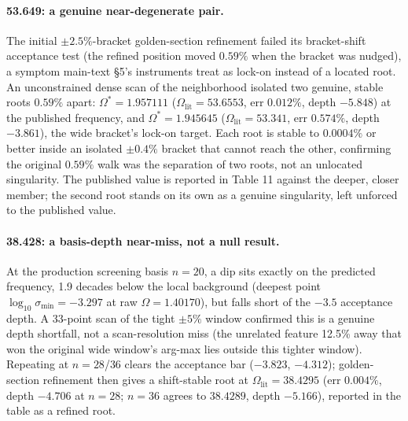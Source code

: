\documentclass[11pt]{article}
\begin{document}
\paragraph{53.649: a genuine near-degenerate pair.} The initial
$\pm2.5\%$-bracket golden-section refinement failed its bracket-shift
acceptance test (the refined position moved $0.59\%$ when the bracket
was nudged), a symptom main-text \S5's instruments treat as lock-on instead of a located root. An unconstrained dense scan of the neighborhood
isolated two genuine, stable roots $0.59\%$ apart: $\Omega^{*}=1.957111$
($\Omega_{\mathrm{lit}}=53.6553$, err $0.012\%$, depth $-5.848$) at the
published frequency, and $\Omega^{*}=1.945645$ ($\Omega_{\mathrm{lit}}=53.341$,
err $0.574\%$, depth $-3.861$), the wide bracket's lock-on target. Each
root is stable to $0.0004\%$ or better inside an isolated $\pm0.4\%$
bracket that cannot reach the other, confirming the original $0.59\%$
walk was the separation of two roots, not an unlocated singularity. The
published value is reported in Table 11 against the
deeper, closer member; the second root stands on its own as a genuine singularity, left unforced to the published value.

\paragraph{38.428: a basis-depth near-miss, not a null result.} At the
production screening basis $n{=}20$, a dip sits exactly on the
predicted frequency, 1.9 decades below the local background (deepest
point $\log_{10}\sigma_{\min}=-3.297$ at raw $\Omega=1.40170$), but
falls short of the $-3.5$ acceptance depth. A 33-point scan of the
tight $\pm5\%$ window confirmed this is a genuine depth shortfall, not
a scan-resolution miss (the unrelated feature 12.5\% away that won the
original wide window's arg-max lies outside this tighter window).
Repeating at $n{=}28$/$36$ clears the acceptance bar ($-3.823$,
$-4.312$); golden-section refinement then gives a shift-stable root at
$\Omega_{\mathrm{lit}}=38.4295$ (err $0.004\%$, depth $-4.706$ at
$n{=}28$; $n{=}36$ agrees to $38.4289$, depth $-5.166$), reported in the
table as a refined root.
\end{document}
